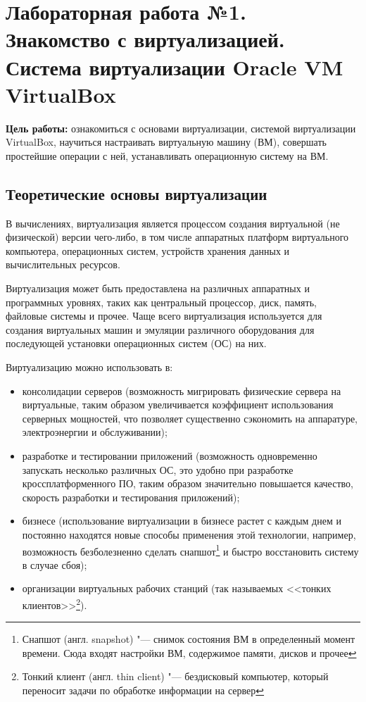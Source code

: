 \section[ЛР №1. Знакомство с виртуализацией, VirtualBox]{Лабораторная работа №1. \\
Знакомство с виртуализацией. Система виртуализации Oracle VM VirtualBox}

\textbf{Цель работы:} ознакомиться с основами виртуализации, системой виртуализации VirtualBox, научиться настраивать виртуальную машину (ВМ), совершать простейшие операции с ней, устанавливать операционную систему на ВМ.

\subsection{Теоретические основы виртуализации}

В вычислениях, виртуализация является процессом создания виртуальной (не физической) версии чего-либо, в том числе аппаратных платформ виртуального компьютера, операционных систем, устройств хранения данных и вычислительных ресурсов.

Виртуализация может быть предоставлена на различных аппаратных и программных уровнях, таких как центральный процессор, диск, память, файловые системы и прочее.
Чаще всего виртуализация используется для создания виртуальных машин и эмуляции различного оборудования для последующей установки операционных систем (ОС) на них.

Виртуализацию можно использовать в:
\begin{itemize}
    \item консолидации серверов (возможность мигрировать физические сервера на виртуальные, таким образом увеличивается коэффициент использования серверных мощностей, что позволяет существенно сэкономить на аппаратуре, электроэнергии и обслуживании);
    \item разработке и тестировании приложений (возможность одновременно запускать несколько различных ОС, это удобно при разработке кроссплатформенного ПО, таким образом значительно повышается качество, скорость разработки и тестирования приложений);
    \item бизнесе (использование виртуализации в бизнесе растет с каждым днем и постоянно находятся новые способы применения этой технологии, например, возможность безболезненно сделать снапшот\footnote{Снапшот (англ. snapshot) "--- снимок состояния ВМ в определенный момент времени. Сюда входят настройки ВМ, содержимое памяти, дисков и прочее} и быстро восстановить систему в случае сбоя);
    \item организации виртуальных рабочих станций (так называемых <<тонких клиентов>>\footnote{Тонкий клиент (англ. thin client) "--- бездисковый компьютер, который переносит задачи по обработке информации на сервер}).
\end{itemize}

